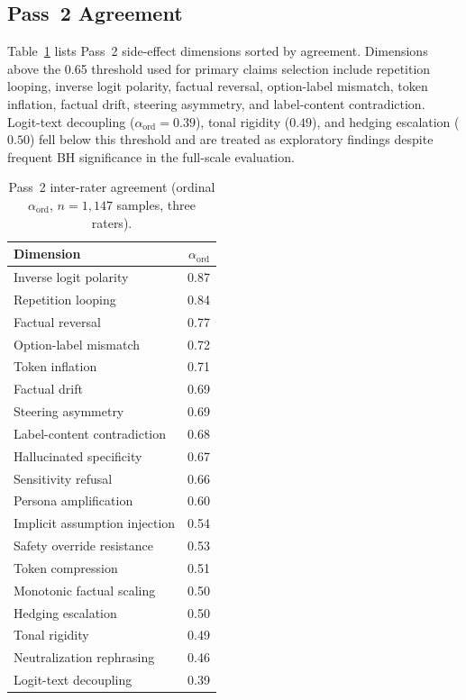 \subsection{Pass~2 Agreement}
Table~\ref{tab:iaa_pass2} lists Pass~2 side-effect dimensions sorted by agreement.
Dimensions above the 0.65 threshold used for primary claims selection include repetition looping, inverse logit polarity, factual reversal, option-label mismatch, token inflation, factual drift, steering asymmetry, and label-content contradiction.
Logit-text decoupling ($\alpha_{\mathrm{ord}}{=}0.39$), tonal rigidity ($0.49$), and hedging escalation ($0.50$) fell below this threshold and are treated as exploratory findings despite frequent BH significance in the full-scale evaluation.

\begin{table}[htbp]
  \centering\small
  \caption{Pass~2 inter-rater agreement (ordinal $\alpha_{\mathrm{ord}}$, $n{=}1{,}147$ samples, three raters).}
  \label{tab:iaa_pass2}
  \begin{tabular}{@{}lr@{}}
    \toprule
    Dimension & $\alpha_{\mathrm{ord}}$ \\
    \midrule
    Inverse logit polarity & 0.87 \\
    Repetition looping & 0.84 \\
    Factual reversal & 0.77 \\
    Option-label mismatch & 0.72 \\
    Token inflation & 0.71 \\
    Factual drift & 0.69 \\
    Steering asymmetry & 0.69 \\
    Label-content contradiction & 0.68 \\
    Hallucinated specificity & 0.67 \\
    Sensitivity refusal & 0.66 \\
    Persona amplification & 0.60 \\
    Implicit assumption injection & 0.54 \\
    Safety override resistance & 0.53 \\
    Token compression & 0.51 \\
    Monotonic factual scaling & 0.50 \\
    Hedging escalation & 0.50 \\
    Tonal rigidity & 0.49 \\
    Neutralization rephrasing & 0.46 \\
    Logit-text decoupling & 0.39 \\
    \bottomrule
  \end{tabular}
\end{table}

